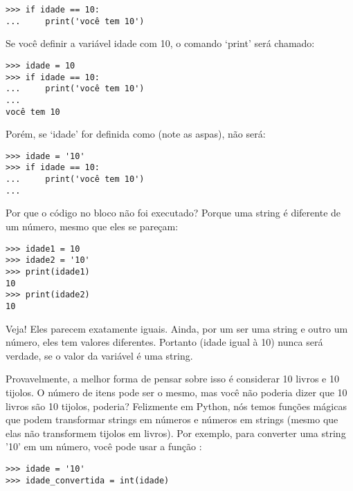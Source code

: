 \begin{listing}
\begin{verbatim}
>>> if idade == 10:
...     print('você tem 10')
\end{verbatim}
\end{listing}

Se você definir a variável idade com 10, o comando `print' será chamado:

\begin{listing}
\begin{verbatim}
>>> idade = 10
>>> if idade == 10:
...     print('você tem 10')
...
você tem 10
\end{verbatim}
\end{listing}

Porém, se `idade' for definida como  (note as aspas), não será:

\begin{listing}
\begin{verbatim}
>>> idade = '10'
>>> if idade == 10:
...     print('você tem 10')
...
\end{verbatim}
\end{listing}

Por que o código no bloco não foi executado? Porque uma string é diferente de um número, mesmo que eles se pareçam:

\begin{listing}
\begin{verbatim}
>>> idade1 = 10
>>> idade2 = '10'
>>> print(idade1)
10
>>> print(idade2)
10
\end{verbatim}
\end{listing}

Veja! Eles parecem exatamente iguais. Ainda, por um ser uma string e outro um número, eles tem valores diferentes. Portanto  (idade igual à 10) nunca será verdade, se o valor da variável é uma string.
\par
Provavelmente, a melhor forma de pensar sobre isso é considerar 10 livros e 10 tijolos. O número de itens pode ser o mesmo, mas você não poderia dizer que 10 livros são 10 tijolos, poderia? Felizmente em Python, nós temos funções mágicas que podem transformar strings em números e números em strings (mesmo que elas não transformem tijolos em livros). Por exemplo, para converter uma string '10' em um número, você pode usar a função :

\begin{listing}
\begin{verbatim}
>>> idade = '10'
>>> idade_convertida = int(idade)
\end{verbatim}
\end{listing}

